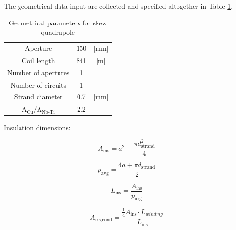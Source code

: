 \documentclass{article}
\begin{document}
The geometrical data input are collected and specified altogether in Table \ref{table:skew_quad_params_table}.

\begin{table}[h!]
    \caption{Geometrical parameters for skew quadrupole \cite{hl_lhc_tech_design_report_v01, marco_prioli_mails}} 
    \vspace{-1.em} 
    \fontsize{10}{10}
    \selectfont 
    \renewcommand{\arraystretch}{1.5}
    \begin{center}
    \begin{tabular}{ ccc }  
    \hline
    Aperture & 150 & [mm]\\
    Coil length & 841 & [m] \\
    Number of apertures & 1 & \\
    Number of circuits & 1 & \\
    Strand diameter & 0.7 & [mm] \\
    $\text{A}_\text{Cu}/\text{A}_\text{Nb-Ti}$ \cite{marco_prioli_mails} & 2.2 & \\
    \hline 
    \end{tabular}
    \end{center}  
     \label{table:skew_quad_params_table} 
 \end{table}

Insulation dimensions:

\begin{equation}
    A_\text{ins} = a^2 - \frac{\pi d_\text{strand}^2}{4}
\end{equation}

\begin{equation}
    p_\text{avg} = \frac{4 a + \pi d_\text{strand}}{2} 
\end{equation}

\begin{equation}
    L_\text{ins} = \frac{A_\text{ins}}{p_\text{avg}}
\end{equation}

\begin{equation}
    A_\text{ins,cond} = \frac{\frac{1}{4} A_\text{ins} \cdot L_{winding}}{L_\text{ins}}
\end{equation}
\end{document}
